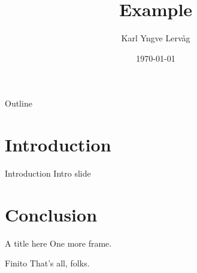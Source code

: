 \documentclass{beamer}
\title{Example}
\author{Karl Yngve Lervåg}
\date{\today}
\begin{document}
\begin{frame}{Outline}
  \tableofcontents
\end{frame}

\section{Introduction}
\begin{frame}{Introduction}
  Intro slide
\end{frame}

\section{Conclusion}
\begin{frame}{A title here}
  One more frame.
\end{frame}
\begin{frame}{Finito}
  That's all, folks.
\end{frame}
\end{document}
